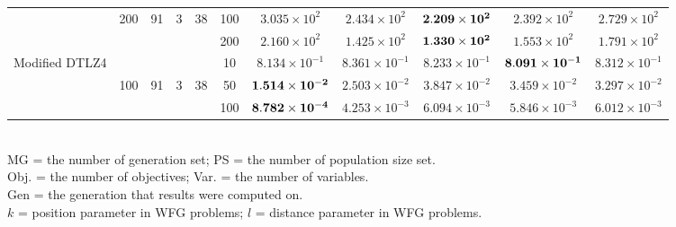\documentclass[../main/main]{subfiles}
\begin{document}
\begin{table}[htbp]
\begin{tabular}{c|ccccc|c|c|c|c|c}
  				   & 200 & 91 & 3 & 38 &100 &$3.035 \times 10^{2}$ & $2.434 \times 10^{2}$ & $\bf{2.209 \times 10^{2}}$ & $2.392 \times 10^{2}$ & $2.729 \times 10^{2}$\\
				   &        &      &&  &200 &$2.160 \times 10^{2}$ & $1.425 \times 10^{2}$ & $\bf{1.330 \times 10^{2}}$ & $1.553 \times 10^{2}$ & $1.791 \times 10^{2}$\\
\hline
\multirow{3}{*}{\fontsize{6.5pt}{0pt}\selectfont Modified DTLZ4} & &&       &       & 10 &$8.134 \times 10^{-1}$ & $8.361 \times 10^{-1}$ & $8.233 \times 10^{-1}$ & $\bf{8.091 \times 10^{-1}}$ & $8.312 \times 10^{-1}$\\
  				   & 100 & 91 & 3 & 38 &50 &$\bf{1.514 \times 10^{-2}}$ & $2.503 \times 10^{-2}$ & $3.847 \times 10^{-2}$ & $3.459 \times 10^{-2}$ & $3.297 \times 10^{-2}$\\
				   &        &      &&  &100 &$\bf{8.782 \times 10^{-4}}$ & $4.253 \times 10^{-3}$ & $6.094 \times 10^{-3}$ & $5.846 \times 10^{-3}$ & $6.012 \times 10^{-3}$\\

\hline

\hline\end{tabular}
\\
{\footnotesize MG = the number of generation set; PS = the number of population size set.}\\
{\footnotesize Obj. = the number of objectives; Var. = the number of variables.}\\
{\footnotesize Gen = the generation that results were computed on.} \\
{\footnotesize $k$ = position parameter in WFG problems; $l$ = distance parameter in WFG problems.}\\
\end{table}
\end{document}

